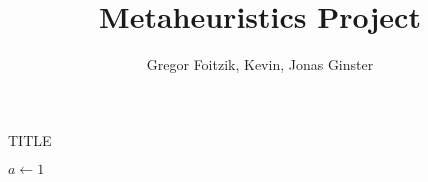 \documentclass[12pt]{article}
\title{Metaheuristics Project}
\author{Gregor Foitzik, Kevin, Jonas Ginster}
\begin{document}
\maketitle
\begin{algorithm}
    \caption{TITLE}
    \begin{algorithmic}[1]
        \State $a\leftarrow 1$
    \end{algorithmic}
\end{algorithm}
\end{document}
